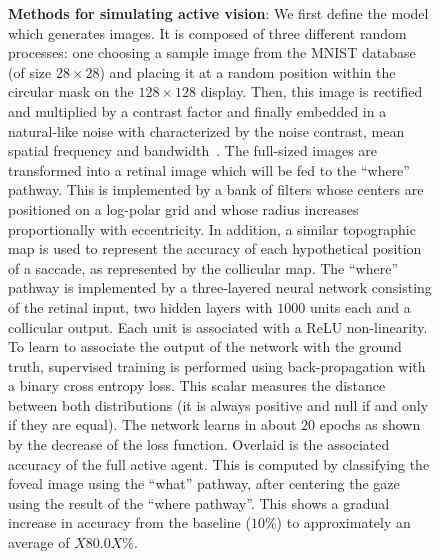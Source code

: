 \begin{figure}[t!]%
\caption{
{\bf Methods for simulating active vision}:
\A We first define the model which generates images. It is composed of three different random processes: one choosing a sample image from the MNIST database (of size $28\times 28$) and placing it at a random position within the circular mask on the $128\times 128$ display. Then, this image is rectified and multiplied by a contrast factor and finally embedded in a natural-like noise with characterized by the noise contrast, mean spatial frequency and bandwidth~\citep{Sanz12}. %
\B The full-sized images are transformed into a retinal image which will be fed to the ``where'' pathway. This is implemented by a bank of filters whose centers are positioned on a log-polar grid and whose radius increases proportionally with eccentricity. In addition, a similar topographic map is used to represent the accuracy of each hypothetical position of a saccade, as represented by the collicular map. %
\C The ``where'' pathway is implemented by a three-layered neural network consisting of the retinal input, two hidden layers with $1000$ units each and a collicular output. Each unit is associated with a ReLU non-linearity. To learn to associate the output of the network with the ground truth, supervised training is performed using back-propagation with a binary cross entropy loss. This scalar measures the distance between both distributions (it is always positive and null if and only if they are equal). The network learns in about $20$ epochs as shown by the decrease of the loss function. Overlaid is the associated accuracy of the full active agent. This is computed by classifying the foveal image using the ``what'' pathway, after centering the gaze using the result of the ``where pathway''. This shows a gradual increase in accuracy from the baseline ($10\%$) to approximately an average of $X80.0X\%$. %
}%
\end{figure}%
%
